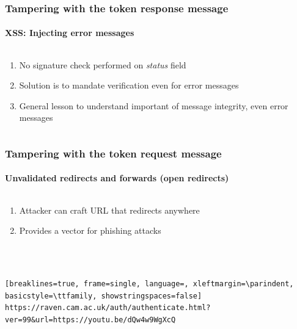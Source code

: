 \documentclass[handout, aspectratio=169, notes=hide]{beamer}
\begin{document}

\begin{frame}
\frametitle{Tampering with the token response message}
\framesubtitle{XSS: Injecting error messages}
\setlength{\parskip}{1.0em}
\begin{columns}[T]
\begin{column}[T]{1.0\textwidth}	
\setlength{\parskip}{1.0em}

\begin{enumerate}
\setlength{\parskip}{1.0em}
\item No signature check performed on {\it status\/} field
\item Solution is to mandate verification even for error messages
\item General lesson to understand important of message integrity, even error messages
\end{enumerate}
\end{column}

\begin{column}[T]{0.0\textwidth}
\end{column}
\end{columns}

\end{frame}
\note{
}



\begin{frame}[fragile]
\frametitle{Tampering with the token request message}
\framesubtitle{Unvalidated redirects and forwards (open redirects)}
\setlength{\parskip}{1.0em}
\begin{columns}[T]
\begin{column}[T]{1.0\textwidth}	
\setlength{\parskip}{1.0em}

\begin{enumerate}
\setlength{\parskip}{1.0em}
\item Attacker can craft URL that redirects anywhere
\item Provides a vector for phishing attacks
\end{enumerate}
\quad \\ \quad \\
\begin{lstlisting}[breaklines=true, frame=single, language=, xleftmargin=\parindent, basicstyle=\ttfamily, showstringspaces=false]
https://raven.cam.ac.uk/auth/authenticate.html?ver=99&url=https://youtu.be/dQw4w9WgXcQ
\end{lstlisting}
\end{column}

\begin{column}[T]{0.0\textwidth}
\end{column}
\end{columns}

\end{frame}
\note{
}
\end{document}
